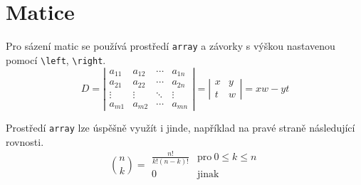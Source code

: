 \documentclass[a4paper, twocolumn, 11pt]{article}
\begin{document}
\section{Matice}
\par Pro sázení matic se používá prostředí \verb|array| a závorky
s výškou nastavenou pomocí \verb|\left|, \verb|\right|.
\begin{displaymath}
   D =
   \left|
    \begin{array}{cccc}
    a_{11} & a_{12} & \cdots & a_{1n} \\
    a_{21} & a_{22} & \cdots & a_{2n} \\
    \vdots & \vdots & \ddots & \vdots \\
    a_{m1} & a_{m2} & \cdots & a_{mn}
    \end{array}
    \right|
    =
    \left|
    \begin{array}{cc}
        x & y \\
        t & w
    \end{array}
    \right|
    = xw - yt
\end{displaymath}


\par Prostředí \verb|array| lze úspěšně využít i jinde, například
na pravé straně následující rovnosti.
\begin{displaymath}
    \binom{n}{k} =
    \begin{array}{ll}
        \frac{n!}{k!(n-k)!} & \mathrm{pro} \ 0 \leq k \leq n \\
        0 & \mathrm{jinak}
    \end{array}
\end{displaymath}
    
\end{document}
